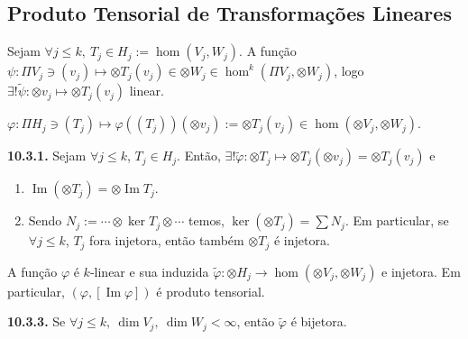 \subsection{Produto Tensorial de Transformações Lineares}

\begin{note}
    Sejam \(\forall j\leq k,\ T_j \in H_j := \hom(V_j, W_j)\). A função \(\psi : \Pi V_j \ni (v_j) \mapsto \otimes T_j(v_j) \in \otimes W_j \in \hom^k(\Pi V_j, \otimes W_j)\), logo \(\exists ! \widetilde{\psi} : \otimes v_j \mapsto \otimes T_j(v_j)\) linear. %
\end{note}
\begin{definition}
    \centering
    \(\varphi: \Pi H_j \ni (T_j) \mapsto \varphi((T_j))(\otimes v_j) := \otimes T_j(v_j) \in \hom(\otimes V_j, \otimes W_j)\). 
\end{definition}
\hypertarget{lemma1031}{}
\begin{lemma}
   \textbf{10.3.1.} Sejam \(\forall j\leq k\), \(T_j \in H_j\). Então, \(\exists ! \widetilde{\varphi}:\otimes T_j \mapsto  \otimes T_j (\otimes v_j) = \otimes T_j(v_j)\) e 
\vspace{-0.2cm}
   \begin{enumerate}[label = (\alph*), left = 0.5cm]
        \item \(\operatorname{Im}(\otimes T_j) = \otimes \operatorname{Im}T_j\).  
        \item Sendo \(N_j := \cdots\otimes \ker T_j \otimes \cdots \) temos, \(\ker (\otimes T_j) = \sum N_j\). Em particular, se \(\forall j\leq k\), \(T_j \) fora injetora, então também \(\otimes T_j\) é injetora. 
   \end{enumerate}
\end{lemma}

\begin{proposition}
    A função \(\varphi\) é $k$-linear e sua induzida \(\widetilde{\varphi} : \otimes H_j \to \hom(\otimes V_j, \otimes W_j)\) e injetora. Em particular, \((\varphi, [\operatorname{Im}\varphi])\) é produto tensorial.   
\end{proposition}
\begin{corollary}
    \textbf{10.3.3.} Se \(\forall j\leq k, \ \dim V_j, \ \dim W_j < \infty\), então \(\widetilde{\varphi}\) é bijetora. 
\end{corollary}


